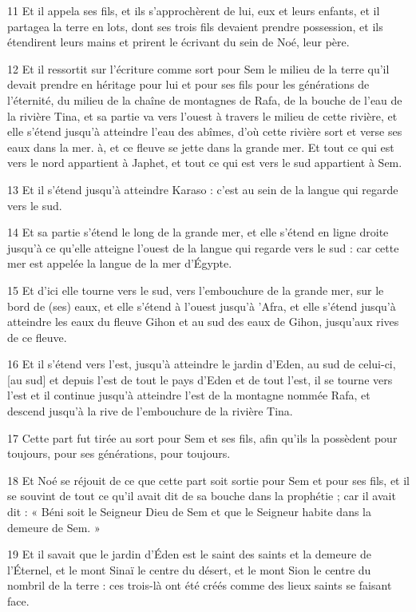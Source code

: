 \par 11 Et il appela ses fils, et ils s'approchèrent de lui, eux et leurs enfants, et il partagea la terre en lots, dont ses trois fils devaient prendre possession, et ils étendirent leurs mains et prirent le écrivant du sein de Noé, leur père.
\par 12 Et il ressortit sur l'écriture comme sort pour Sem le milieu de la terre qu'il devait prendre en héritage pour lui et pour ses fils pour les générations de l'éternité, du milieu de la chaîne de montagnes de Rafa, de la bouche de l'eau de la rivière Tina, et sa partie va vers l'ouest à travers le milieu de cette rivière, et elle s'étend jusqu'à atteindre l'eau des abîmes, d'où cette rivière sort et verse ses eaux dans la mer. à, et ce fleuve se jette dans la grande mer. Et tout ce qui est vers le nord appartient à Japhet, et tout ce qui est vers le sud appartient à Sem.
\par 13 Et il s'étend jusqu'à atteindre Karaso : c'est au sein de la langue qui regarde vers le sud.
\par 14 Et sa partie s'étend le long de la grande mer, et elle s'étend en ligne droite jusqu'à ce qu'elle atteigne l'ouest de la langue qui regarde vers le sud : car cette mer est appelée la langue de la mer d'Égypte.
\par 15 Et d'ici elle tourne vers le sud, vers l'embouchure de la grande mer, sur le bord de (ses) eaux, et elle s'étend à l'ouest jusqu'à 'Afra, et elle s'étend jusqu'à atteindre les eaux du fleuve Gihon et au sud des eaux de Gihon, jusqu'aux rives de ce fleuve.
\par 16 Et il s'étend vers l'est, jusqu'à atteindre le jardin d'Eden, au sud de celui-ci, [au sud] et depuis l'est de tout le pays d'Eden et de tout l'est, il se tourne vers l'est et il continue jusqu'à atteindre l'est de la montagne nommée Rafa, et descend jusqu'à la rive de l'embouchure de la rivière Tina.
\par 17 Cette part fut tirée au sort pour Sem et ses fils, afin qu'ils la possèdent pour toujours, pour ses générations, pour toujours.
\par 18 Et Noé se réjouit de ce que cette part soit sortie pour Sem et pour ses fils, et il se souvint de tout ce qu'il avait dit de sa bouche dans la prophétie ; car il avait dit : « Béni soit le Seigneur Dieu de Sem et que le Seigneur habite dans la demeure de Sem. »
\par 19 Et il savait que le jardin d'Éden est le saint des saints et la demeure de l'Éternel, et le mont Sinaï le centre du désert, et le mont Sion le centre du nombril de la terre : ces trois-là ont été créés comme des lieux saints se faisant face.
